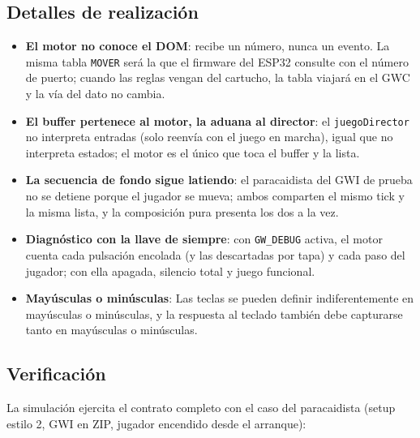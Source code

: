 \subsection{Detalles de realización}
\label{subsec:DetallesF3I2}

\begin{itemize}
	\item \textbf{El motor no conoce el DOM}: recibe un número, nunca un evento. La
	misma tabla \texttt{MOVER} será la que el firmware del ESP32 consulte con el número de
	puerto; cuando las reglas vengan del cartucho, la tabla viajará en el GWC y la vía del
	dato no cambia.
	\item \textbf{El buffer pertenece al motor, la aduana al director}: el
	\texttt{juegoDirector} no interpreta entradas (solo reenvía con el juego en marcha),
	igual que no interpreta estados; el motor es el único que toca el buffer y la lista.
	\item \textbf{La secuencia de fondo sigue latiendo}: el paracaidista del GWI de
	prueba no se detiene porque el jugador se mueva; ambos comparten el mismo tick y la
	misma lista, y la composición pura presenta los dos a la vez.
	\item \textbf{Diagnóstico con la llave de siempre}: con \texttt{GW\_DEBUG} activa,
	el motor cuenta cada pulsación encolada (y las descartadas por tapa) y cada paso del
	jugador; con ella apagada, silencio total y juego funcional.
	\item \textbf{Mayúsculas o minúsculas}: Las teclas se pueden definir indiferentemente en mayúsculas o minúsculas, y la respuesta al teclado también debe capturarse tanto en mayúsculas o minúsculas.
\end{itemize}

\subsection{Verificación}
\label{subsec:VerificacionF3I2}

La simulación ejercita el contrato completo con el caso del paracaidista (setup estilo 2,
GWI en ZIP, jugador encendido desde el arranque):

